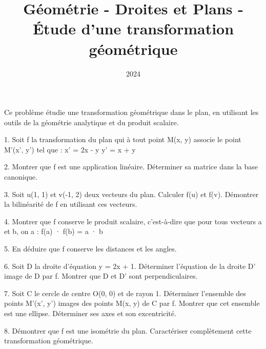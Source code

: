 \documentclass[10pt,a4paper]{article}
\title{Géométrie - Droites et Plans - Étude d'une transformation géométrique}
\author{}
\date{2024}
\begin{document}
\maketitle

Ce problème étudie une transformation géométrique dans le plan, en utilisant les outils de la géométrie analytique et du produit scalaire.

1. Soit f la transformation du plan qui à tout point M(x, y) associe le point M'(x', y') tel que :
   x' = 2x - y
   y' = x + y

2. Montrer que f est une application linéaire. Déterminer sa matrice dans la base canonique.

3. Soit u(1, 1) et v(-1, 2) deux vecteurs du plan.
  \ql Calculer f(u) et f(v).
  \ql Démontrer la bilinéarité de f en utilisant ces vecteurs.

4. Montrer que f conserve le produit scalaire, c'est-à-dire que pour tous vecteurs a et b, on a :
   f(a) · f(b) = a · b

5. En déduire que f conserve les distances et les angles.

6. Soit D la droite d'équation y = 2x + 1.
  \ql Déterminer l'équation de la droite D' image de D par f.
  \ql Montrer que D et D' sont perpendiculaires.

7. Soit C le cercle de centre O(0, 0) et de rayon 1.
  \ql Déterminer l'ensemble des points M'(x', y') images des points M(x, y) de C par f.
  \ql Montrer que cet ensemble est une ellipse. Déterminer ses axes et son excentricité.

8. Démontrer que f est une isométrie du plan. Caractériser complètement cette transformation géométrique.
\end{document}
